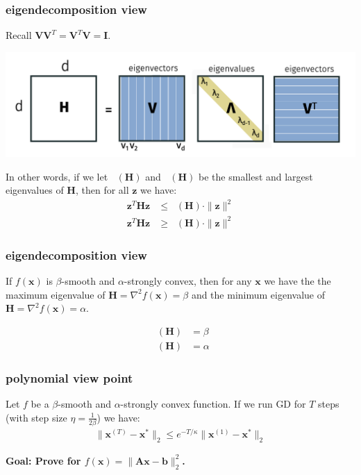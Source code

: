 \documentclass[compress]{beamer}
\newcommand{\bv}[1]{\mathbf{#1}}
\DeclareMathOperator*{\lmin}{\lambda_{min}}
\DeclareMathOperator*{\lmax}{\lambda_{max}}
\begin{document}
\begin{frame}[t]
	\frametitle{eigendecomposition view}
	Recall $\bv{V}\bv{V}^T = \bv{V}^T\bv{V} = \bv{I}$.
	\begin{center}
		\includegraphics[width=.9\textwidth]{eigendecomp.png}
	\end{center}
In other words, if we let $\lmax(\bv{H})$ and $\lmin(\bv{H})$ be the smallest and largest eigenvalues of $\bv{H}$, then for all $\bv{z}$ we have: 
\begin{align*}
	\bv{z}^T\bv{H}\bv{z} &\leq \lmax(\bv{H})\cdot \|\bv{z}\|^2 \\
	\bv{z}^T\bv{H}\bv{z} &\geq \lmin(\bv{H})\cdot \|\bv{z}\|^2 
\end{align*}

\end{frame}


\begin{frame}[t]
	\frametitle{eigendecomposition view}
	If $f(\bv{x})$ is $\beta$-smooth and $\alpha$-strongly convex, then for any $\bv{x}$ we have the the maximum eigenvalue of $\bv{H} = \nabla^2f(\bv{x}) = \beta$ and the minimum eigenvalue of $\bv{H} = \nabla^2f(\bv{x}) = \alpha$. 
	
	\begin{align*}
		\lmax(\bv{H}) &= \beta\\
		\lmin(\bv{H}) &= \alpha
	\end{align*}
\end{frame}

\begin{frame}[t]
	\frametitle{polynomial view point}
	\begin{theorem}
		Let $f$ be a $\beta$-smooth and $\alpha$-strongly convex function. If we run GD for $T$ steps (with step size $\eta = \frac{1}{2\beta}$) we have:
		\begin{align*}
		\|\bv{x}^{(T)} - \bv{x}^*\|_2 \leq e^{-T/\kappa} \|\bv{x}^{(1)} - \bv{x}^*\|_2
		\end{align*} 
	\end{theorem}
	
	\begin{center}
		\alert{\textbf{Goal: Prove for $f(\bv{x}) = \|\bv{A}\bv{x} - \bv{b}\|_2^2$.}}
	\end{center}	
\end{frame}
\end{document}
